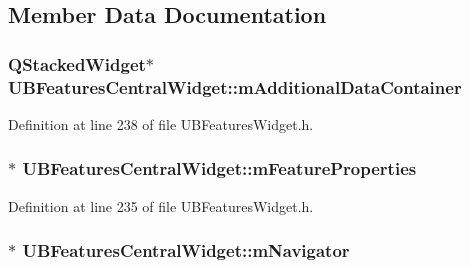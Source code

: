 \subsection{Member Data Documentation}
\hypertarget{class_u_b_features_central_widget_acf9e5e0db5d8f596115dc05aa9bd6179}{
\subsubsection[{m\-Additional\-Data\-Container}]{\setlength{\rightskip}{0pt plus 5cm}Q\-Stacked\-Widget$\ast$ U\-B\-Features\-Central\-Widget\-::m\-Additional\-Data\-Container}}\label{da/d07/class_u_b_features_central_widget_acf9e5e0db5d8f596115dc05aa9bd6179}


Definition at line 238 of file U\-B\-Features\-Widget.\-h.

\hypertarget{class_u_b_features_central_widget_ac30b1892592bc9c4094d94cb45788412}{
\subsubsection[{m\-Feature\-Properties}]{$\ast$ U\-B\-Features\-Central\-Widget\-::m\-Feature\-Properties}}\label{da/d07/class_u_b_features_central_widget_ac30b1892592bc9c4094d94cb45788412}


Definition at line 235 of file U\-B\-Features\-Widget.\-h.

\hypertarget{class_u_b_features_central_widget_a2acf43463b3d0d270fa72edc73f59d0f}{
\subsubsection[{m\-Navigator}]{$\ast$ U\-B\-Features\-Central\-Widget\-::m\-Navigator}}\label{da/d07/class_u_b_features_central_widget_a2acf43463b3d0d270fa72edc73f59d0f}


